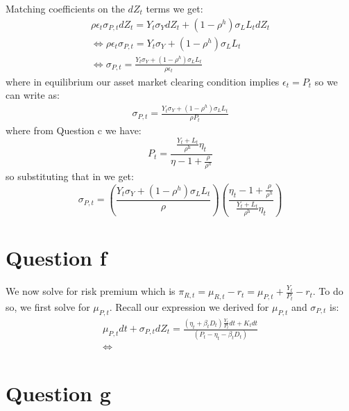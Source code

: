 \documentclass{article}
\begin{document}
    Matching coefficients on the $dZ_t$ terms we get:
    \[
    \begin{aligned}
        \rho \epsilon_t \sigma_{P, t} d Z_t = Y_t \sigma_Y d Z_t + (1 - \rho^h) \sigma_L L_t d Z_t\\
        \iff \rho \epsilon_t \sigma_{P, t}  = Y_t \sigma_Y + (1 - \rho^h) \sigma_L L_t \\
        \iff \sigma_{P, t} = \frac{Y_t \sigma_Y + (1 - \rho^h) \sigma_L L_t}{\rho \epsilon_t}
    \end{aligned}    
    \]
    where in equilibrium our asset market clearing condition implies $\epsilon_t = P_t$ so we can write as:
    \[
        \begin{aligned}
            \sigma_{P, t} = \frac{Y_t \sigma_Y + (1 - \rho^h) \sigma_L L_t}{\rho P_t}%
        \end{aligned}   
    \]
    where from Question c we have:
    \[
        P_t = \frac{\frac{Y_{t} + L_t}{\rho^{\mathrm{h}}}\eta_t}{\eta - 1 + \frac{\rho}{\rho^h}}
    \]
    so substituting that in we get:
    \[
        \boxed{\sigma_{P, t} = \left(\frac{Y_t \sigma_Y + (1 - \rho^h) \sigma_L L_t}{\rho}\right) \left(\frac{\eta_t - 1 + \frac{\rho}{\rho^h}}{\frac{Y_{t} + L_t}{\rho^{\mathrm{h}}}\eta_t} \right)}
    \]

\section*{Question f}
We now solve for risk premium which is $\pi_{R, t} = \mu_{R, t} - r_t = \mu_{P, t} + \frac{Y_t}{P_t} - r_t$. To do so, we first solve for $\mu_{P, t}$. Recall our expression we derived for $\mu_{P, t}$ and $\sigma_{P, t }$ is:
\[\begin{aligned}
    \mu_{P, t} d t+\sigma_{P, t} d Z_{t} = \frac{(\eta_t + \beta_t D_t) \frac{Y_t}{P_t} d t + K_t d t}{(P_t - \eta_t - \beta_t D_t)}\\
    \iff 
\end{aligned}\]
\section*{Question g}
\end{document}
